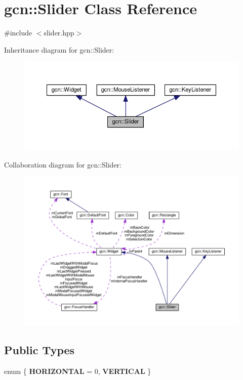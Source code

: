 \hypertarget{classgcn_1_1Slider}{}\section{gcn\+:\+:Slider Class Reference}
\label{classgcn_1_1Slider}


{\ttfamily \#include $<$slider.\+hpp$>$}



Inheritance diagram for gcn\+:\+:Slider\+:\nopagebreak
\begin{figure}[H]
\begin{center}
\leavevmode
\includegraphics[width=350pt]{classgcn_1_1Slider__inherit__graph}
\end{center}
\end{figure}


Collaboration diagram for gcn\+:\+:Slider\+:\nopagebreak
\begin{figure}[H]
\begin{center}
\leavevmode
\includegraphics[width=350pt]{classgcn_1_1Slider__coll__graph}
\end{center}
\end{figure}
\subsection*{Public Types}
\begin{DoxyCompactItemize}
\item 
enum \{ {\bfseries H\+O\+R\+I\+Z\+O\+N\+T\+AL} = 0, 
{\bfseries V\+E\+R\+T\+I\+C\+AL}
 \}
\end{DoxyCompactItemize}
